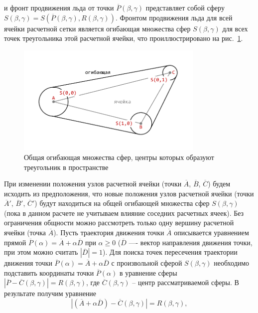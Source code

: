 и фронт продвижения льда от точки $\overline{P}(\beta,\gamma)$ представляет собой сферу $S(\beta,\gamma) = S(\overline{P}(\beta,\gamma),R(\beta,\gamma))$.
Фронтом продвижения льда для всей ячейки расчетной сетки является огибающая множества сфер $S(\beta,\gamma)$ для всех точек треугольника этой расчетной ячейки, что проиллюстрировано на рис.~\ref{fig:text_1_remesh_common_envelope_1}.

\begin{figure}[ht]
	\centering
		\includegraphics[width=0.80\textwidth]{./pics/text_1_remesh_common_envelope/triangle.pdf}
	\caption{Общая огибающая множества сфер, центры которых образуют треугольник в пространстве}
	\label{fig:text_1_remesh_common_envelope_1}
\end{figure}

При изменении положения узлов расчетной ячейки (точки $\overline{A}$, $\overline{B}$, $\overline{C}$) будем исходить из предположения, что новые положения узлов расчетной ячейки (точки $\overline{A}'$, $\overline{B}'$, $\overline{C}'$) будут находиться на общей огибающей множества сфер $S(\beta,\gamma)$ (пока в данном расчете не учитываем влияние соседних расчетных ячеек).
Без ограничения общности можно рассмотреть только одну вершину расчетной ячейки (точка $\overline{A}$).
Пусть траектория движения точки $\overline{A}$ описывается уравнением прямой $\overline{P}(\alpha) = \overline{A} + \alpha \overline{D}$ при $\alpha \ge 0$ ($\overline{D}$ —- вектор направления движения точки, при этом можно считать $|\overline{D}| = 1$).
Для поиска точек пересечения траектории движения точки $\overline{P}(\alpha) = \overline{A} + \alpha \overline{D}$ с произвольной сферой $S(\beta,\gamma)$ необходимо подставить координаты точки $\overline{P}(\alpha)$ в уравнение сферы $|\overline{P} - \overline{C}(\beta,\gamma)| = R(\beta,\gamma)$, где $\overline{C}(\beta,\gamma)$ -- центр рассматриваемой сферы.
В результате получим уравнение
\begin{equation}
	|(\overline{A} + \alpha \overline{D}) - \overline{C}(\beta, \gamma)| = R(\beta, \gamma),
\end{equation}

